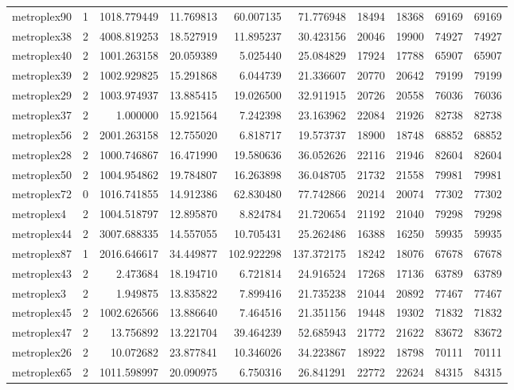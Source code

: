 \begin{longtable}{|l|r|r|r|r|r|r|r|r|r|}
metroplex90 & 1 & 1018.779449 & 11.769813 & 60.007135 & 71.776948 & 18494 & 18368 & 69169 & 69169 \\
metroplex38 & 2 & 4008.819253 & 18.527919 & 11.895237 & 30.423156 & 20046 & 19900 & 74927 & 74927 \\
metroplex40 & 2 & 1001.263158 & 20.059389 & 5.025440 & 25.084829 & 17924 & 17788 & 65907 & 65907 \\
metroplex39 & 2 & 1002.929825 & 15.291868 & 6.044739 & 21.336607 & 20770 & 20642 & 79199 & 79199 \\
metroplex29 & 2 & 1003.974937 & 13.885415 & 19.026500 & 32.911915 & 20726 & 20558 & 76036 & 76036 \\
metroplex37 & 2 & 1.000000 & 15.921564 & 7.242398 & 23.163962 & 22084 & 21926 & 82738 & 82738 \\
metroplex56 & 2 & 2001.263158 & 12.755020 & 6.818717 & 19.573737 & 18900 & 18748 & 68852 & 68852 \\
metroplex28 & 2 & 1000.746867 & 16.471990 & 19.580636 & 36.052626 & 22116 & 21946 & 82604 & 82604 \\
metroplex50 & 2 & 1004.954862 & 19.784807 & 16.263898 & 36.048705 & 21732 & 21558 & 79981 & 79981 \\
metroplex72 & 0 & 1016.741855 & 14.912386 & 62.830480 & 77.742866 & 20214 & 20074 & 77302 & 77302 \\
metroplex4 & 2 & 1004.518797 & 12.895870 & 8.824784 & 21.720654 & 21192 & 21040 & 79298 & 79298 \\
metroplex44 & 2 & 3007.688335 & 14.557055 & 10.705431 & 25.262486 & 16388 & 16250 & 59935 & 59935 \\
metroplex87 & 1 & 2016.646617 & 34.449877 & 102.922298 & 137.372175 & 18242 & 18076 & 67678 & 67678 \\
metroplex43 & 2 & 2.473684 & 18.194710 & 6.721814 & 24.916524 & 17268 & 17136 & 63789 & 63789 \\
metroplex3 & 2 & 1.949875 & 13.835822 & 7.899416 & 21.735238 & 21044 & 20892 & 77467 & 77467 \\
metroplex45 & 2 & 1002.626566 & 13.886640 & 7.464516 & 21.351156 & 19448 & 19302 & 71832 & 71832 \\
metroplex47 & 2 & 13.756892 & 13.221704 & 39.464239 & 52.685943 & 21772 & 21622 & 83672 & 83672 \\
metroplex26 & 2 & 10.072682 & 23.877841 & 10.346026 & 34.223867 & 18922 & 18798 & 70111 & 70111 \\
metroplex65 & 2 & 1011.598997 & 20.090975 & 6.750316 & 26.841291 & 22772 & 22624 & 84315 & 84315 \\

\end{longtable}
